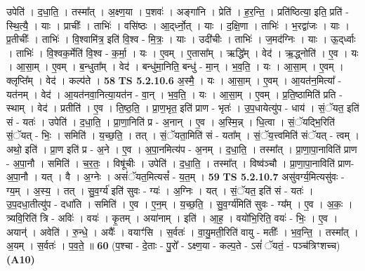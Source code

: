 \documentclass[17pt]{extarticle}
\begin{document}
                  उपेति॑ । द॒धा॒ति॒ । तस्मा᳚त् । अ॒क्ष्ण॒या । प॒शवः॑ । अङ्गा॑नि । प्रेति॑ । ह॒र॒न्ति॒ । प्रति॑ष्ठित्या॒ इति॒ प्रति॑ - स्थि॒त्यै॒ । याः । प्राचीः᳚ । ताभिः॑ । वसि॑ष्ठः । आ॒द्‌र्ध्नो॒त् । याः । द॒क्षि॒णा । ताभिः॑ । भ॒रद्वा॑जः । याः । प्र॒तीचीः᳚ । ताभिः॑ । वि॒श्वामि॑त्र॒ इति॑ वि॒श्व - मि॒त्रः॒ । याः । उदी॑चीः । ताभिः॑ । ज॒मद॑ग्निः । याः । ऊ॒द्‌र्ध्वाः । ताभिः॑ । वि॒श्वक॒र्मेति॑ वि॒श्व - क॒र्मा॒ । यः । ए॒वम् । ए॒तासा᳚म् । ऋद्धि᳚म् । वेद॑ । ऋ॒द्ध्नोति॑ । ए॒व । यः । आ॒सा॒म् । ए॒वम् । ब॒न्धुता᳚म् । वेद॑ । बन्धु॑मा॒निति॒ बन्धु॑ - मा॒न् । भ॒व॒ति॒ । यः । आ॒सा॒म् । ए॒वम् । क्लृप्ति᳚म् । वेद॑ । कल्प॑ते । \textbf{  58} \newline
                  \newline
                                \textbf{ TS 5.2.10.6} \newline
                  अ॒स्मै॒ । यः । आ॒सा॒म् । ए॒वम् । आ॒यत॑न॒मित्या᳚ - यत॑नम् । वेद॑ । आ॒यत॑नवा॒नित्या॒यत॑न - वा॒न् । भ॒व॒ति॒ । यः । आ॒सा॒म् । ए॒वम् । प्र॒ति॒ष्ठामिति॑ प्रति - स्थाम् । वेद॑ । प्रतीति॑ । ए॒व । ति॒ष्ठ॒ति॒ । प्रा॒ण॒भृत॒ इति॑ प्राण - भृतः॑ । उ॒प॒धायेत्यु॑प - धाय॑ । सं॒ॅयत॒ इति॑ सं - यतः॑ । उपेति॑ । द॒धा॒ति॒ । प्रा॒णा॒निति॑ प्र - अ॒नान् । ए॒व । अ॒स्मि॒न्न् । धि॒त्वा । सं॒ॅयद्भि॒रिति॑ सं॒ॅयत् - भिः॒ । समिति॑ । य॒च्छ॒ति॒ । तत् । सं॒ॅयता॒मिति॑ सं - यता᳚म् । सं॒ॅय॒त्त्वमिति॑ संॅयत् - त्वम् । अथो॒ इति॑ । प्रा॒ण इति॑ प्र - अ॒ने । ए॒व । अ॒पा॒नमित्य॑प - अ॒नम् । द॒धा॒ति॒ । तस्मा᳚त् । प्रा॒णा॒पा॒नाविति॑ प्राण - अ॒पा॒नौ । समिति॑ । च॒र॒तः॒ । विषू॑चीः । उपेति॑ । द॒धा॒ति॒ । तस्मा᳚त् । विष्व॑ञ्चौ । प्रा॒णा॒पा॒नाविति॑ प्राण-अ॒पा॒नौ । यत् । वै । अ॒ग्नेः । असं॑ॅयत॒मित्यसं᳚ - य॒त॒म् । \textbf{  59} \newline
                  \newline
                                \textbf{ TS 5.2.10.7} \newline
                  असु॑वर्ग्य॒मित्यसु॑वः - ग्य॒म् । अ॒स्य॒ । तत् । सु॒व॒र्ग्य॑ इति॑ सुवः - ग्यः॑ । अ॒ग्निः । यत् । सं॒ॅयत॒ इति॑ सं - यतः॑ । उ॒प॒दधा॒तीत्यु॑प - दधा॑ति । समिति॑ । ए॒व । ए॒न॒म् । य॒च्छ॒ति॒ । सु॒व॒र्ग्य॑मिति॑ सुवः - ग्य᳚म् । ए॒व । अ॒कः॒ । त्र्यवि॒रिति॑ त्रि - अविः॑ । वयः॑ । कृ॒तम् । अया॑नाम् । इति॑ । आ॒ह॒ । वयो॑भि॒रिति॒ वयः॑ - भिः॒ । ए॒व । अयान्॑ । अवेति॑ । रु॒न्धे॒ । अयैः᳚ । वयाꣳ॑सि । स॒र्वतः॑ । वा॒यु॒मती॒रिति॑ वायु - मतीः᳚ । भ॒व॒न्ति॒ । तस्मा᳚त् । अ॒यम् । स॒र्वतः॑ । प॒व॒ते॒ ॥ \textbf{  60 } \newline
                  \newline
                       (प॒श्चा - दे॒ताः - पु॒रो᳚ - ऽक्ष्ण॒या - कल्प॒ते - ऽसं॑ ॅयतं॒ - पञ्च॑त्रिꣳशच्च)  \textbf{(A10)} \newline \newline
\end{document}
